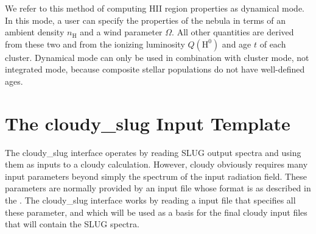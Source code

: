 \documentclass[letterpaper,10pt,english]{sphinxmanual}
\begin{document}
We refer to this method of computing HII region properties as
dynamical mode. In this mode, a user can specify the properties of the
nebula in terms of an ambient density \(n_{\mathrm{H}}\) and
a wind parameter \(\Omega\). All other quantities are
derived from these two and from the ionizing luminosity
\(Q(\mathrm{H}^0)\) and age \(t\) of each cluster. Dynamical
mode can only be used in combination with cluster mode, not integrated
mode, because composite stellar populations do not have well-defined
ages.


\section{The cloudy\_slug Input Template}
\label{\detokenize{cloudy:ssec-cloudy-template}}\label{\detokenize{cloudy:the-cloudy-slug-input-template}}
The cloudy\_slug interface operates by reading SLUG output spectra and
using them as inputs to a cloudy calculation. However, cloudy
obviously requires many input parameters beyond simply the spectrum of
the input radiation field. These parameters are normally provided by
an input file whose format is as described in the . The cloudy\_slug interface works by reading a
 input file that specifies all these parameter, and which
will be used as a basis for the final cloudy input files that will
contain the SLUG spectra.
\end{document}
